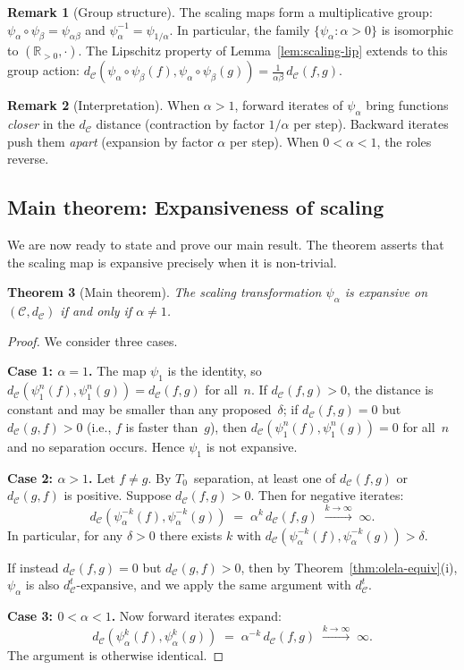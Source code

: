 \documentclass[11pt,a4paper]{article}
\theoremstyle{plain}
\newtheorem{theoreminner}{Theorem}[section]
\theoremstyle{definition}
\newtheorem{remarkinner}[theoreminner]{Remark}
\newenvironment{theorem}[1][]{\begin{theoreminner}[#1]}{\end{theoreminner}}
\newenvironment{remark}[1][]{\begin{remarkinner}[#1]}{\end{remarkinner}}
\newcommand{\R}{\mathbb{R}}
\newcommand{\C}{\mathcal{C}}
\begin{document}
\begin{remark}[Group structure]
The scaling maps form a multiplicative group:
$\psi_\alpha\circ\psi_\beta=\psi_{\alpha\beta}$ and
$\psi_\alpha^{-1}=\psi_{1/\alpha}$.  In particular, the family
$\{\psi_\alpha:\alpha>0\}$ is isomorphic to $(\R_{>0},\cdot)$.
The Lipschitz property of Lemma~\ref{lem:scaling-lip} extends
to this group action:
$d_\C(\psi_\alpha\circ\psi_\beta(f),\psi_\alpha\circ\psi_\beta(g))
=\frac{1}{\alpha\beta}\,d_\C(f,g)$.
\end{remark}

\begin{remark}[Interpretation]
When $\alpha>1$, forward iterates of $\psi_\alpha$ bring functions
\emph{closer} in the $d_\C$ distance (contraction by factor
$1/\alpha$ per step).  Backward iterates push them \emph{apart}
(expansion by factor $\alpha$ per step).  When $0<\alpha<1$, the
roles reverse.
\end{remark}


\subsection{Main theorem: Expansiveness of scaling}

We are now ready to state and prove our main result.  The theorem
asserts that the scaling map is expansive precisely when it is
non-trivial.

\begin{theorem}[Main theorem]\label{thm:main-scaling}
The scaling transformation $\psi_\alpha$ is expansive on $(\C,d_\C)$
if and only if $\alpha\neq 1$.
\end{theorem}

\begin{proof}
We consider three cases.

\textbf{Case 1: $\alpha=1$.}  The map $\psi_1$ is the identity, so
$d_\C(\psi_1^n(f),\psi_1^n(g))=d_\C(f,g)$ for all~$n$.  If
$d_\C(f,g)>0$, the distance is constant and may be smaller than any
proposed~$\delta$; if $d_\C(f,g)=0$ but $d_\C(g,f)>0$ (i.e., $f$ is
faster than~$g$), then $d_\C(\psi_1^n(f),\psi_1^n(g))=0$ for all~$n$
and no separation occurs.  Hence $\psi_1$ is not expansive.

\textbf{Case 2: $\alpha>1$.}  Let $f\neq g$.  By $T_0$~separation,
at least one of $d_\C(f,g)$ or $d_\C(g,f)$ is positive.  Suppose
$d_\C(f,g)>0$.  Then for negative iterates:
\[
  d_\C(\psi_\alpha^{-k}(f),\psi_\alpha^{-k}(g))
  \;=\; \alpha^k\,d_\C(f,g)
  \;\xrightarrow{k\to\infty}\;\infty.
\]
In particular, for any $\delta>0$ there exists $k$ with
$d_\C(\psi_\alpha^{-k}(f),\psi_\alpha^{-k}(g))>\delta$.

If instead $d_\C(f,g)=0$ but $d_\C(g,f)>0$, then by
Theorem~\ref{thm:olela-equiv}(i), $\psi_\alpha$ is also
$d_\C^t$-expansive, and we apply the same argument with $d_\C^t$.

\textbf{Case 3: $0<\alpha<1$.}  Now forward iterates expand:
\[
  d_\C(\psi_\alpha^k(f),\psi_\alpha^k(g))
  \;=\;\alpha^{-k}\,d_\C(f,g)
  \;\xrightarrow{k\to\infty}\;\infty.
\]
The argument is otherwise identical.
\end{proof}
\end{document}
